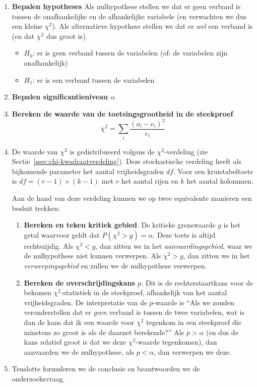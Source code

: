 \begin{enumerate}
  \item \textbf{Bepalen hypotheses}
  Als nulhypothese stellen we dat er geen verband is tussen de onafhankelijke en de afhankelijke variabele (en verwachten we dus een kleine $\chi^2$). Als alternatieve hypothese stellen we dat er \emph{wel} een verband is (en dat $\chi^2$ dus groot is).
  \begin{itemize}
    \item $H_{0}$: er is geen verband tussen de variabelen (of: de variabelen zijn onafhankelijk)
    \item $H_{1}$: er is een verband tussen de variabelen
  \end{itemize}

  \item \textbf{Bepalen significantieniveau $\alpha$}
  
  \item \textbf{Bereken de waarde van de toetsingsgrootheid in de steekproef}
  \[ \chi^{2} = \sum_{i} \frac{(o_{i} - e_{i})^{2}}{e_{i}} \]
  
  \item De waarde van $\chi^2$ is gedistribueerd volgens de $\chi^2$-verdeling (zie Sectie~\ref{ssec:chi-kwadraatverdeling}). Deze stochastische verdeling heeft als bijkomende parameter het aantal vrijheidsgraden $df$. Voor een kruistabeltoets is $df = (r - 1) \times (k - 1)$ met $r$ het aantal rijen en $k$ het aantal kolommen.
  
  Aan de hand van deze verdeling kunnen we op twee equivalente manieren een besluit trekken:
  
  \begin{enumerate}
    \item \textbf{Bereken en teken kritiek gebied}. De kritieke grenswaarde $g$ is het getal waarvoor geldt dat $P(\chi^2 > g) = \alpha$. Deze toets is altijd rechtszijdig. Als $\chi^2 < g$, dan zitten we in het \emph{aanvaardingsgebied}, waar we de nulhypothese niet kunnen verwerpen. Als $\chi^2 > g$, dan zitten we in het \emph{verwerpingsgebied} en zullen we de nulhypothese verwerpen.
    \item \textbf{Bereken de overschrijdingskans $p$}. Dit is de rechterstaartkans voor de bekomen $\chi^2$-statistiek in de steekproef, afhankelijk van het aantal vrijheidsgraden. De interpretatie van de $p$-waarde is ``Als we zouden veronderstellen dat er \emph{geen} verband is tussen de twee variabelen, wat is dan de kans dat ik een waarde voor $\chi^2$ tegenkom in een steekproef die minstens zo groot is als de daarnet berekende?'' Als $p > \alpha$ (en dus de kans relatief groot is dat we deze $ \chi^2$-waarde tegenkomen), dan aanvaarden we de nulhypothese, als $p < \alpha$, dan verwerpen we deze.
  \end{enumerate}

  \item Tenslotte formuleren we de conclusie en beantwoorden we de onderzoeksvraag.
\end{enumerate}

